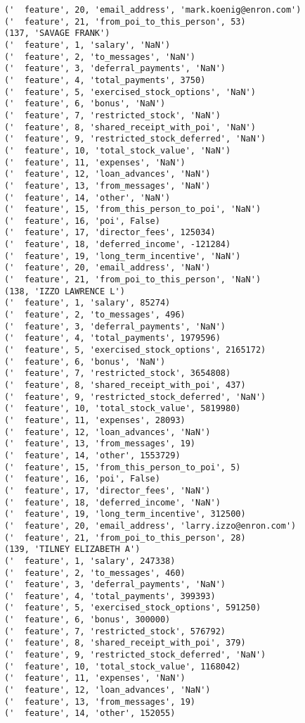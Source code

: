 \begin{verbatim}
('  feature', 20, 'email_address', 'mark.koenig@enron.com')
('  feature', 21, 'from_poi_to_this_person', 53)
(137, 'SAVAGE FRANK')
('  feature', 1, 'salary', 'NaN')
('  feature', 2, 'to_messages', 'NaN')
('  feature', 3, 'deferral_payments', 'NaN')
('  feature', 4, 'total_payments', 3750)
('  feature', 5, 'exercised_stock_options', 'NaN')
('  feature', 6, 'bonus', 'NaN')
('  feature', 7, 'restricted_stock', 'NaN')
('  feature', 8, 'shared_receipt_with_poi', 'NaN')
('  feature', 9, 'restricted_stock_deferred', 'NaN')
('  feature', 10, 'total_stock_value', 'NaN')
('  feature', 11, 'expenses', 'NaN')
('  feature', 12, 'loan_advances', 'NaN')
('  feature', 13, 'from_messages', 'NaN')
('  feature', 14, 'other', 'NaN')
('  feature', 15, 'from_this_person_to_poi', 'NaN')
('  feature', 16, 'poi', False)
('  feature', 17, 'director_fees', 125034)
('  feature', 18, 'deferred_income', -121284)
('  feature', 19, 'long_term_incentive', 'NaN')
('  feature', 20, 'email_address', 'NaN')
('  feature', 21, 'from_poi_to_this_person', 'NaN')
(138, 'IZZO LAWRENCE L')
('  feature', 1, 'salary', 85274)
('  feature', 2, 'to_messages', 496)
('  feature', 3, 'deferral_payments', 'NaN')
('  feature', 4, 'total_payments', 1979596)
('  feature', 5, 'exercised_stock_options', 2165172)
('  feature', 6, 'bonus', 'NaN')
('  feature', 7, 'restricted_stock', 3654808)
('  feature', 8, 'shared_receipt_with_poi', 437)
('  feature', 9, 'restricted_stock_deferred', 'NaN')
('  feature', 10, 'total_stock_value', 5819980)
('  feature', 11, 'expenses', 28093)
('  feature', 12, 'loan_advances', 'NaN')
('  feature', 13, 'from_messages', 19)
('  feature', 14, 'other', 1553729)
('  feature', 15, 'from_this_person_to_poi', 5)
('  feature', 16, 'poi', False)
('  feature', 17, 'director_fees', 'NaN')
('  feature', 18, 'deferred_income', 'NaN')
('  feature', 19, 'long_term_incentive', 312500)
('  feature', 20, 'email_address', 'larry.izzo@enron.com')
('  feature', 21, 'from_poi_to_this_person', 28)
(139, 'TILNEY ELIZABETH A')
('  feature', 1, 'salary', 247338)
('  feature', 2, 'to_messages', 460)
('  feature', 3, 'deferral_payments', 'NaN')
('  feature', 4, 'total_payments', 399393)
('  feature', 5, 'exercised_stock_options', 591250)
('  feature', 6, 'bonus', 300000)
('  feature', 7, 'restricted_stock', 576792)
('  feature', 8, 'shared_receipt_with_poi', 379)
('  feature', 9, 'restricted_stock_deferred', 'NaN')
('  feature', 10, 'total_stock_value', 1168042)
('  feature', 11, 'expenses', 'NaN')
('  feature', 12, 'loan_advances', 'NaN')
('  feature', 13, 'from_messages', 19)
('  feature', 14, 'other', 152055)

\end{verbatim}
